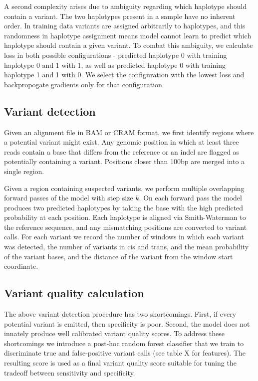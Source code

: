 \documentclass[]{article}
\begin{document}
A second complexity arises due to ambiguity regarding which haplotype should contain a variant. The two haplotypes present in a sample have no inherent order. In training data variants are assigned arbitrarily to haplotypes, and this randomness in haplotype assignment means model cannot learn to predict which haplotype should contain a given variant. To combat this ambiguity, we calculate loss in both possible configurations - predicted haplotype 0 with training haplotype 0 and 1 with 1, as well as predicted haplotype 0 with training haplotype 1 and 1 with 0. We select the configuration with the lowest loss and backpropogate gradients only for that configuration. 


\subsection{Variant detection}

Given an alignment file in BAM or CRAM format, we first identify regions where a potential variant might exist. Any genomic position in which at least three reads contain a base that differs from the reference or an indel are flagged as potentially containing a variant. Positions closer than 100bp are merged into a single region. 

Given a region containing suspected variants, we perform multiple overlapping forward passes of the model with step size $k$. On each forward pass the model produces two predicted haplotypes by taking the base with the high predicted probability at each position. Each haplotype is aligned via Smith-Waterman to the reference sequence, and any mismatching positions are converted to variant calls. For each variant we record the number of windows in which each variant was detected, the number of variants in cis and trans, and the mean probability of the variant bases, and the distance of the variant from the window start coordinate.

\subsection{Variant quality calculation}

The above variant detection procedure has two shortcomings. First, if every potential variant is emitted, then specificity is poor. Second, the model does not innately produce well calibrated variant quality scores. To address these shortcomings we introduce a post-hoc random forest classifier that we train to discriminate true and false-positive variant calls (see table X for features).  The resulting score is used as a final variant quality score suitable for tuning the tradeoff between sensitivity and specificity. 
\end{document}
